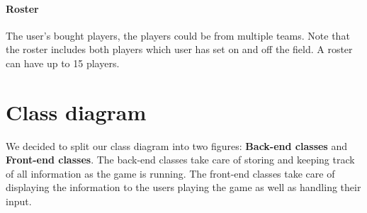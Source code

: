 \documentclass{article}
\begin{document}
\paragraph{Roster} The user's bought players, the players could be from multiple teams. Note that the roster includes both players which user has set on and off the field. A roster can have up to 15 players.

\section{Class diagram}
We decided to split our class diagram into two figures: \textbf{Back-end classes} and \textbf{Front-end classes}. The back-end classes take care of storing and keeping track of all information as the game is running. The front-end classes take care of displaying the information to the users playing the game as well as handling their input.
\end{document}
